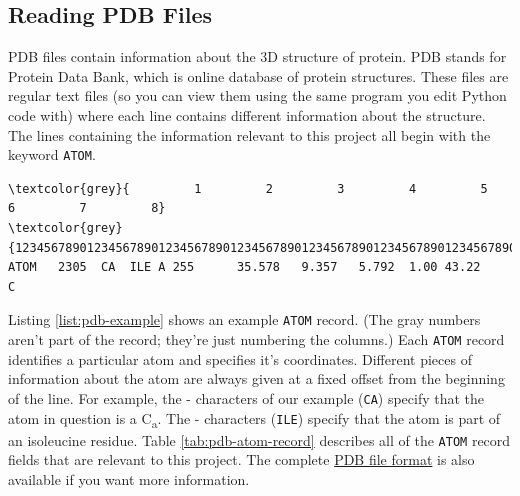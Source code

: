 \documentclass{article}
\newcommand{\calpha}{C\textsubscript{\textgreek{a}}}
\newcommand{\atomrec}{\texttt{ATOM} record}
\begin{document}
\subsection{Reading PDB Files}

PDB files contain information about the 3D structure of protein.  PDB stands 
for Protein Data Bank, which is online database of protein structures.  These  
files are regular text files (so you can view them using the same program you 
edit Python code with) where each line contains different information about the 
structure.  The lines containing the information relevant to this project all 
begin with the keyword \texttt{ATOM}.  

\begin{listing}[h]
\centering
\begin{BVerbatim}[fontsize=\footnotesize,commandchars=\\\{\}]
\textcolor{grey}{         1         2         3         4         5         6         7         8}
\textcolor{grey}{12345678901234567890123456789012345678901234567890123456789012345678901234567890}
ATOM   2305  CA  ILE A 255      35.578   9.357   5.792  1.00 43.22           C  
\end{BVerbatim}
\caption{An example \atomrec{}.}
\label{list:pdb-example}
\end{listing}

Listing \ref{list:pdb-example} shows an example \atomrec{}.  (The gray numbers 
aren't part of the record; they're just numbering the columns.)  Each 
\atomrec{} identifies a particular atom and specifies it's coordinates.  
Different pieces of information about the atom are always given at a fixed 
offset from the beginning of the line.  For example, the  -  
characters of our example (\texttt{CA}) specify that the atom in question is a 
\calpha{}.  The  -  characters (\texttt{ILE}) specify that the 
atom is part of an isoleucine residue.
Table \ref{tab:pdb-atom-record} describes all of the \atomrec{} fields that are 
relevant to this project.  The complete 
\href{http://www.wwpdb.org/documentation/format33/v3.3.html}{PDB file format} 
is also available if you want more information.
\end{document}
